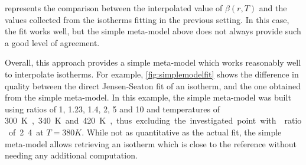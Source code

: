 \documentclass[main.tex]{subfiles}
\begin{document}
 represents the comparison between the interpolated value of $\beta(r, T)$ and the values collected from the isotherms fitting in the previous setting. In this case, the fit works well, but the simple meta-model above does not always provide such a good level of agreement.

Overall, this approach provides a simple meta-model which works reasonably well to interpolate isotherms. For example, \cref{fig:simplemodelfit} shows the difference in quality between the direct Jensen-Seaton fit of an isotherm, and the one obtained from the simple meta-model. In this example, the simple meta-model was built using \SiAl ratios of 1, 1.23, 1.4, 2, 5 and 10 and temperatures of \qty{300}K, \qty{340}K and \qty{420}K, thus excluding the investigated point with \SiAl ratio of 2.4 at $T = \qty{380}K$. While not as quantitative as the actual fit, the simple meta-model allows retrieving an isotherm which is close to the reference without needing any additional computation.
\end{document}
